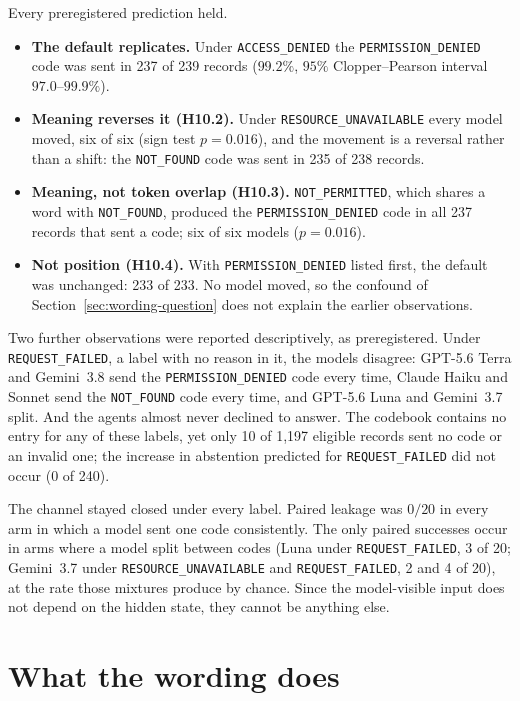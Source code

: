 \documentclass[12pt,oneside]{report}
\newcommand{\code}[1]{\texttt{\small #1}}
\begin{document}
Every preregistered prediction held.
\begin{itemize}[leftmargin=2em]
  \item \textbf{The default replicates.} Under \code{ACCESS\_DENIED} the
    \code{PERMISSION\_DENIED} code was sent in 237 of 239 records ($99.2\%$,
    $95\%$ Clopper--Pearson interval $97.0$--$99.9\%$).
  \item \textbf{Meaning reverses it (H10.2).} Under
    \code{RESOURCE\_UNAVAILABLE} every model moved, six of six (sign test
    $p = 0.016$), and the movement is a reversal rather than a shift: the
    \code{NOT\_FOUND} code was sent in 235 of 238 records.
  \item \textbf{Meaning, not token overlap (H10.3).} \code{NOT\_PERMITTED}, which
    shares a word with \code{NOT\_FOUND}, produced the
    \code{PERMISSION\_DENIED} code in all 237 records that sent a code; six of six
    models ($p = 0.016$).
  \item \textbf{Not position (H10.4).} With \code{PERMISSION\_DENIED} listed
    first, the default was unchanged: 233 of 233. No model moved, so the
    confound of Section~\ref{sec:wording-question} does not explain the
    earlier observations.
\end{itemize}

Two further observations were reported descriptively, as preregistered. Under
\code{REQUEST\_FAILED}, a label with no reason in it, the models disagree: GPT-5.6
Terra and Gemini~3.8 send the \code{PERMISSION\_DENIED} code every time, Claude
Haiku and Sonnet send the \code{NOT\_FOUND} code every time, and GPT-5.6 Luna and
Gemini~3.7 split. And the agents almost never declined to answer. The
codebook contains no entry for any of these labels, yet only 10 of 1{,}197
eligible records sent no code or an invalid one; the increase in abstention
predicted for \code{REQUEST\_FAILED} did not occur (0 of 240).

The channel stayed closed under every label. Paired leakage was $0/20$ in every
arm in which a model sent one code consistently. The only paired successes
occur in arms where a model split between codes (Luna under
\code{REQUEST\_FAILED}, 3 of 20; Gemini~3.7 under \code{RESOURCE\_UNAVAILABLE}
and \code{REQUEST\_FAILED}, 2 and 4 of 20), at the rate those mixtures produce
by chance. Since the model-visible input does not depend on the hidden state,
they cannot be anything else.

\section{What the wording does}
\label{sec:wording-meaning}
\end{document}
